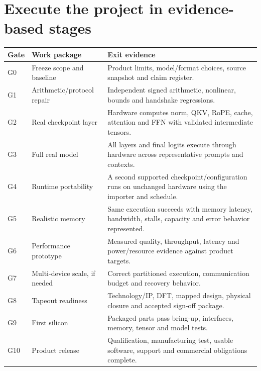 \documentclass[11pt,a4paper]{article}
\newcommand{\phase}[2]{\clearpage\section{#1}\label{#2}}
\begin{document}
\phase{Execute the project in evidence-based stages}{sec:order}
\begin{tabularx}{\linewidth}{@{}p{14mm}p{39mm}Y@{}}
\toprule\textbf{Gate} & \textbf{Work package} & \textbf{Exit evidence}\\\midrule
G0 & Freeze scope and baseline & Product limits, model/format choices, source snapshot and claim register.\\
G1 & Arithmetic/protocol repair & Independent signed arithmetic, nonlinear, bounds and handshake regressions.\\
G2 & Real checkpoint layer & Hardware computes norm, QKV, RoPE, cache, attention and FFN with validated intermediate tensors.\\
G3 & Full real model & All layers and final logits execute through hardware across representative prompts and contexts.\\
G4 & Runtime portability & A second supported checkpoint/configuration runs on unchanged hardware using the importer and schedule.\\
G5 & Realistic memory & Same execution succeeds with memory latency, bandwidth, stalls, capacity and error behavior represented.\\
G6 & Performance prototype & Measured quality, throughput, latency and power/resource evidence against product targets.\\
G7 & Multi-device scale, if needed & Correct partitioned execution, communication budget and recovery behavior.\\
G8 & Tapeout readiness & Technology/IP, DFT, mapped design, physical closure and accepted sign-off package.\\
G9 & First silicon & Packaged parts pass bring-up, interfaces, memory, tensor and model tests.\\
G10 & Product release & Qualification, manufacturing test, usable software, support and commercial obligations complete.\\\bottomrule
\end{tabularx}
\end{document}
